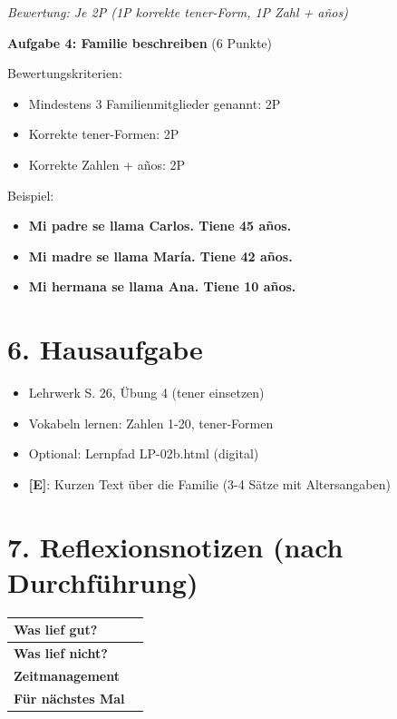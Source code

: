 \documentclass[11pt, a4paper]{article}
\newcommand{\E}{\textcolor{erweiterung}{\textbf{[E]}}}
\newcommand{\loesung}[1]{\textcolor{loesung}{\textbf{#1}}}
\begin{document}
\textit{Bewertung: Je 2P (1P korrekte tener-Form, 1P Zahl + años)}

\vspace{1em}

\textbf{Aufgabe 4: Familie beschreiben} (6 Punkte)

Bewertungskriterien:
\begin{itemize}
    \item Mindestens 3 Familienmitglieder genannt: 2P
    \item Korrekte tener-Formen: 2P
    \item Korrekte Zahlen + años: 2P
\end{itemize}

Beispiel:
\begin{itemize}
    \item \loesung{Mi padre se llama Carlos. Tiene 45 años.}
    \item \loesung{Mi madre se llama María. Tiene 42 años.}
    \item \loesung{Mi hermana se llama Ana. Tiene 10 años.}
\end{itemize}


\section*{6. Hausaufgabe}

\begin{itemize}
    \item Lehrwerk S. 26, Übung 4 (tener einsetzen)
    \item Vokabeln lernen: Zahlen 1-20, tener-Formen
    \item Optional: Lernpfad LP-02b.html (digital)
    \item \E{}: Kurzen Text über die Familie (3-4 Sätze mit Altersangaben)
\end{itemize}


\section*{7. Reflexionsnotizen (nach Durchführung)}

\begin{tabularx}{\textwidth}{|l|X|}
\hline
\textbf{Was lief gut?} & \\[2em]
\hline
\textbf{Was lief nicht?} & \\[2em]
\hline
\textbf{Zeitmanagement} & \\[2em]
\hline
\textbf{Für nächstes Mal} & \\[2em]
\hline
\end{tabularx}
\end{document}
